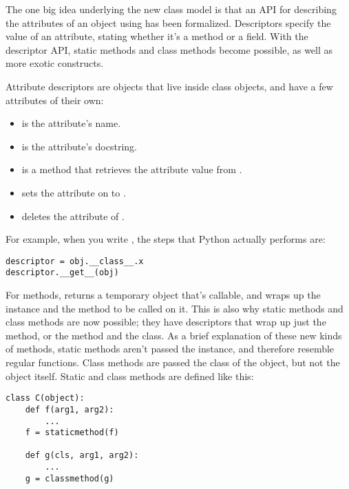 \documentclass{howto}
\begin{document}
The one big idea underlying the new class model is that an API for
describing the attributes of an object using  has
been formalized.  Descriptors specify the value of an attribute,
stating whether it's a method or a field.  With the descriptor API,
static methods and class methods become possible, as well as more
exotic constructs.

Attribute descriptors are objects that live inside class objects, and
have a few attributes of their own:

\begin{itemize}

\item {} is the attribute's name.

\item {} is the attribute's docstring.

\item {} is a method that retrieves the
attribute value from . 

\item {} sets the attribute
on  to .

\item {} deletes the  
attribute of .
\end{itemize}

For example, when you write , the steps that Python
actually performs are:

\begin{verbatim}
descriptor = obj.__class__.x
descriptor.__get__(obj)
\end{verbatim}

For methods,  returns a temporary object that's
callable, and wraps up the instance and the method to be called on it.
This is also why static methods and class methods are now possible;
they have descriptors that wrap up just the method, or the method and
the class.  As a brief explanation of these new kinds of methods,
static methods aren't passed the instance, and therefore resemble
regular functions.  Class methods are passed the class of the object,
but not the object itself.  Static and class methods are defined like
this:

\begin{verbatim}
class C(object):
    def f(arg1, arg2):
        ...
    f = staticmethod(f)

    def g(cls, arg1, arg2):
        ...
    g = classmethod(g)
\end{verbatim}
\end{document}
